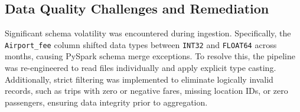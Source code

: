 \subsection{Data Quality Challenges and Remediation}
Significant schema volatility was encountered during ingestion. Specifically, the \texttt{Airport\_fee} column shifted data types between \texttt{INT32} and \texttt{FLOAT64} across months, causing PySpark schema merge exceptions. To resolve this, the pipeline was re-engineered to read files individually and apply explicit type casting. Additionally, strict filtering was implemented to eliminate logically invalid records, such as trips with zero or negative fares, missing location IDs, or zero passengers, ensuring data integrity prior to aggregation.
